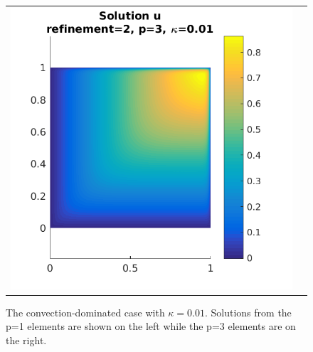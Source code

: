 \documentclass{article}
\begin{document}
\begin{figure}[!ht]
\begin{tabular}{c c}
\includegraphics[scale=0.7]{umu_233.png}
\end{tabular}
\caption{The convection-dominated case with $\kappa = 0.01$. Solutions from the p=1 elements are shown on the left while the p=3 elements are on the right.}
\label{fig:u1}
\end{figure}
\end{document}
